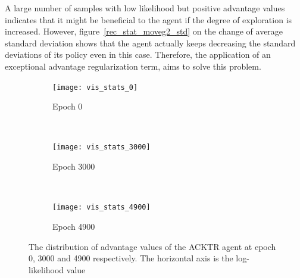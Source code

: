 A large number of samples with low likelihood but positive advantage values indicates that it might be beneficial to the agent if the degree of exploration is increased. However, figure~\ref{rec_stat_moveg2_std} on the change of average standard deviation shows that the agent actually keeps decreasing the standard deviations of its policy even in this case. Therefore, the application of an exceptional advantage regularization term, aims to solve this problem.
\begin{figure}[!htbp]
	\centering
	\begin{subfigure}[t]{0.5\textwidth}
		\centering
		\texttt{[image: vis\_stats\_0]}
		\caption{Epoch 0}
			\label{vis_stats_0}
	\end{subfigure}%
	~ 
	\begin{subfigure}[t]{0.5\textwidth}
		\centering
		\texttt{[image: vis\_stats\_3000]}
		\caption{Epoch 3000}
			\label{vis_stats_3000}
	\end{subfigure}
	~ 
	\begin{subfigure}[t]{0.7\textwidth}
		\centering
		\texttt{[image: vis\_stats\_4900]}
		\caption{Epoch 4900}
		\label{vis_stats_4900}
	\end{subfigure}
	\caption{The distribution of advantage values of the ACKTR agent at epoch 0, 3000 and 4900 respectively. The horizontal axis is the log-likelihood value}
\end{figure}
%
%

